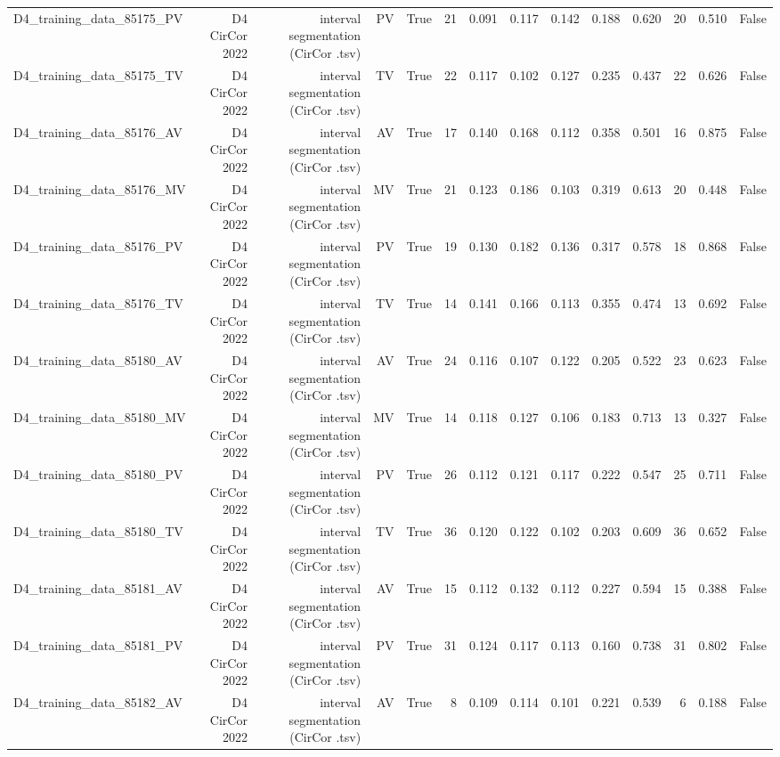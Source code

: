 \begin{table}[htbp]
\begin{tabular}{lrrrrrrrrrrrrr}
    D4\_training\_data\_85175\_PV & D4 CirCor 2022 & interval segmentation (CirCor .tsv) & PV & True & 21 & 0.091 & 0.117 & 0.142 & 0.188 & 0.620 & 20 & 0.510 & False \\
    D4\_training\_data\_85175\_TV & D4 CirCor 2022 & interval segmentation (CirCor .tsv) & TV & True & 22 & 0.117 & 0.102 & 0.127 & 0.235 & 0.437 & 22 & 0.626 & False \\
    D4\_training\_data\_85176\_AV & D4 CirCor 2022 & interval segmentation (CirCor .tsv) & AV & True & 17 & 0.140 & 0.168 & 0.112 & 0.358 & 0.501 & 16 & 0.875 & False \\
    D4\_training\_data\_85176\_MV & D4 CirCor 2022 & interval segmentation (CirCor .tsv) & MV & True & 21 & 0.123 & 0.186 & 0.103 & 0.319 & 0.613 & 20 & 0.448 & False \\
    D4\_training\_data\_85176\_PV & D4 CirCor 2022 & interval segmentation (CirCor .tsv) & PV & True & 19 & 0.130 & 0.182 & 0.136 & 0.317 & 0.578 & 18 & 0.868 & False \\
    D4\_training\_data\_85176\_TV & D4 CirCor 2022 & interval segmentation (CirCor .tsv) & TV & True & 14 & 0.141 & 0.166 & 0.113 & 0.355 & 0.474 & 13 & 0.692 & False \\
    D4\_training\_data\_85180\_AV & D4 CirCor 2022 & interval segmentation (CirCor .tsv) & AV & True & 24 & 0.116 & 0.107 & 0.122 & 0.205 & 0.522 & 23 & 0.623 & False \\
    D4\_training\_data\_85180\_MV & D4 CirCor 2022 & interval segmentation (CirCor .tsv) & MV & True & 14 & 0.118 & 0.127 & 0.106 & 0.183 & 0.713 & 13 & 0.327 & False \\
    D4\_training\_data\_85180\_PV & D4 CirCor 2022 & interval segmentation (CirCor .tsv) & PV & True & 26 & 0.112 & 0.121 & 0.117 & 0.222 & 0.547 & 25 & 0.711 & False \\
    D4\_training\_data\_85180\_TV & D4 CirCor 2022 & interval segmentation (CirCor .tsv) & TV & True & 36 & 0.120 & 0.122 & 0.102 & 0.203 & 0.609 & 36 & 0.652 & False \\
    D4\_training\_data\_85181\_AV & D4 CirCor 2022 & interval segmentation (CirCor .tsv) & AV & True & 15 & 0.112 & 0.132 & 0.112 & 0.227 & 0.594 & 15 & 0.388 & False \\
    D4\_training\_data\_85181\_PV & D4 CirCor 2022 & interval segmentation (CirCor .tsv) & PV & True & 31 & 0.124 & 0.117 & 0.113 & 0.160 & 0.738 & 31 & 0.802 & False \\
    D4\_training\_data\_85182\_AV & D4 CirCor 2022 & interval segmentation (CirCor .tsv) & AV & True & 8 & 0.109 & 0.114 & 0.101 & 0.221 & 0.539 & 6 & 0.188 & False \\

\end{tabular}
\end{table}
